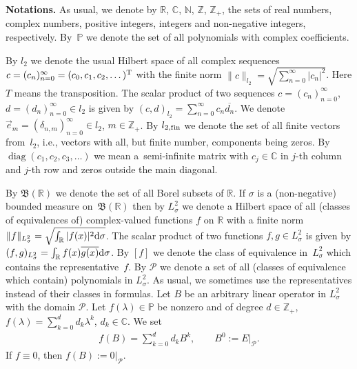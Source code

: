 {\bf Notations.} As usual, we denote by $\mathbb{R}$, $\mathbb{C}$, $\mathbb{N}$, $\mathbb{Z}$, $\mathbb{Z}_+$, the sets of real numbers, complex numbers, positive integers, integers and non-negative integers, respectively. By~$\mathbb{P}$ we denote the set of all polynomials with complex coef\/f\/icients.

By $l_2$ we denote the usual Hilbert space of all complex sequences $c = (c_n)_{n=0}^\infty = (c_0,c_1,c_2,\dots)^{\rm T}$ with the f\/inite norm $\| c \|_{l_2} = \sqrt{\sum\limits_{n=0}^\infty |c_n|^2}$. Here $T$ means the transposition. The scalar product of two sequences $c = (c_n)_{n=0}^\infty$, $d = (d_n)_{n=0}^\infty\in l_2$ is given by $(c,d)_{l_2} = \sum\limits_{n=0}^\infty c_n \overline{d_n}$. We denote $\vec e_m = (\delta_{n,m})_{n=0}^\infty\in l_2$, $m\in\mathbb{Z}_+$. By $l_{2,{\rm f\/in}}$ we denote the set of all f\/inite vectors from~$l_2$, i.e., vectors with all, but f\/inite number, components being zeros. By $\operatorname{diag} (c_1,c_2,c_3,\dots)$ we mean a~semi-inf\/inite matrix with $c_j\in\mathbb{C}$ in $j$-th column and $j$-th row and zeros outside the main diagonal.

By $\mathfrak{B}(\mathbb{R})$ we denote the set of all Borel subsets of $\mathbb{R}$. If $\sigma$ is a (non-negative) bounded measure on~$\mathfrak{B}(\mathbb{R})$ then by $L^2_\sigma$ we denote a Hilbert space of all (classes of equivalences of) complex-valued functions $f$ on $\mathbb{R}$ with a f\/inite norm $\| f \|_{L^2_\sigma} = \sqrt{ \int_\mathbb{R} |f(x)|^2 {\rm d}\sigma }$. The scalar product of two functions $f,g\in L^2_\sigma$ is given by $(f,g)_{L^2_\sigma} = \int_{\mathbb{R}} f(x) \overline{g(x)} {\rm d}\sigma$. By $[ f ]$ we denote the class of equivalence in~$L^2_\sigma$ which contains the representative~$f$. By $\mathcal{P}$ we denote a set of all (classes of equivalence which contain) polynomials in $L^2_\sigma$. As usual, we sometimes use the representatives instead of their classes in formulas. Let $B$ be an arbitrary linear operator in $L^2_\sigma$ with the domain $\mathcal{P}$. Let $f(\lambda)\in\mathbb{P}$ be nonzero and of degree $d\in\mathbb{Z}_+$, $f(\lambda) = \sum\limits_{k=0}^d d_k \lambda^k$, $d_k\in\mathbb{C}$. We set
\begin{gather*} f(B) = \sum_{k=0}^d d_k B^k,\qquad B^0 := E|_{\mathcal{P}}. \end{gather*}
If $f\equiv 0$, then $f(B):= 0|_{\mathcal{P}}$.

